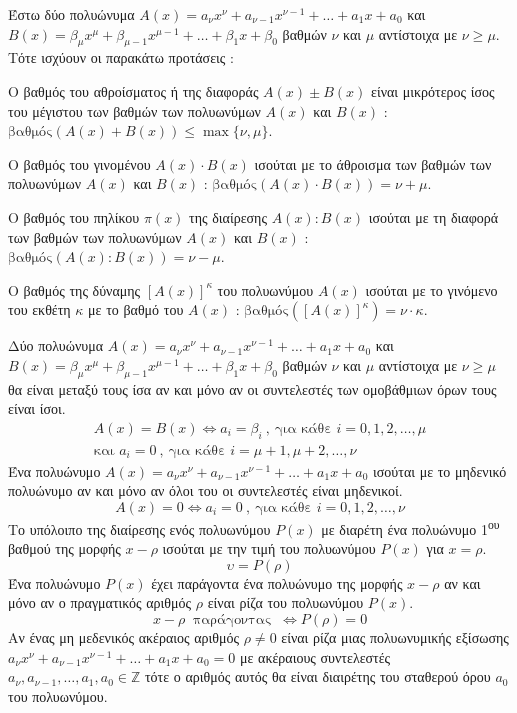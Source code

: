 \documentclass[twoside,nofonts,internet,shmeiwseis]{thewria}
\newcommand{\tss}[1]{\textsuperscript{#1}}
\begin{document}
\thewrhmata
{}
Έστω δύο πολυώνυμα $ A(x)=a_\nu x^\nu+a_{\nu-1}x^{\nu-1}+\ldots+a_1x+a_0 $ και $ B(x)=\beta_\mu x^\mu+\beta_{\mu-1}x^{\mu-1}+\ldots+\beta_1x+\beta_0 $ βαθμών $ \nu $ και $ \mu $ αντίστοιχα με $ \nu\geq\mu $. Τότε ισχύουν οι παρακάτω προτάσεις :
\begin{rlist}
\item Ο βαθμός του αθροίσματος ή της διαφοράς $ A(x)\pm B(x) $ είναι μικρότερος ίσος του μέγιστου των βαθμών των πολυωνύμων $ A(x) $ και $ B(x) $ : $ \textrm{βαθμός}(A(x)+B(x))\leq\max\{\nu,\mu\} $.
\item Ο βαθμός του γινομένου $ A(x)\cdot B(x) $ ισούται με το άθροισμα των βαθμών των πολυωνύμων $ A(x) $ και $ B(x) $ : $ \textrm{βαθμός}(A(x)\cdot B(x))=\nu+\mu $.
\item Ο βαθμός του πηλίκου $ \pi(x) $ της διαίρεσης $ A(x):B(x) $ ισούται με τη διαφορά των βαθμών των πολυωνύμων $ A(x) $ και $ B(x) $ : $ \textrm{βαθμός}(A(x): B(x))=\nu-\mu $.
\item Ο βαθμός της δύναμης $ [A(x)]^\kappa $ του πολυωνύμου $ A(x) $ ισούται με το γινόμενο του εκθέτη $ \kappa $ με το βαθμό του $ A(x) $ : $ \textrm{βαθμός}([A(x)]^\kappa)=\nu\cdot\kappa $.
\end{rlist}
Δύο πολυώνυμα $ A(x)=a_\nu x^\nu+a_{\nu-1}x^{\nu-1}+\ldots+a_1x+a_0 $ και $ B(x)=\beta_\mu x^\mu+\beta_{\mu-1}x^{\mu-1}+\ldots+\beta_1x+\beta_0 $ βαθμών $ \nu $ και $ \mu $ αντίστοιχα με $ \nu\geq\mu $ θα είναι μεταξύ τους ίσα αν και μόνο αν οι συντελεστές των ομοβάθμιων όρων τους είναι ίσοι.
\begin{gather*}
A(x)=B(x)\Leftrightarrow a_i=\beta_i\ ,\ \textrm{για κάθε }i=0,1,2,\ldots,\mu\\
\textrm{και }a_i=0\ ,\ \textrm{για κάθε }i=\mu+1,\mu+2,\ldots,\nu
\end{gather*}
Ένα πολυώνυμο $ A(x)=a_\nu x^\nu+a_{\nu-1}x^{\nu-1}+\ldots+a_1x+a_0 $ ισούται με το μηδενικό πολυώνυμο αν και μόνο αν όλοι του οι συντελεστές είναι μηδενικοί.
\[ A(x)=0\Leftrightarrow a_i=0 \ ,\ \textrm{για κάθε }i=0,1,2,\ldots,\nu\]
Το υπόλοιπο της διαίρεσης ενός πολυωνύμου $ P(x) $ με διαρέτη ένα πολυώνυμο 1\tss{ου} βαθμού της μορφής $ x-\rho $ ισούται με την τιμή του πολυωνύμου $ P(x) $ για $ x=\rho $.
\[ \upsilon=P(\rho) \]
Ένα πολυώνυμο $ P(x) $ έχει παράγοντα ένα πολυώνυμο της μορφής $ x-\rho $ αν και μόνο αν ο πραγματικός αριθμός $ \rho $ είναι ρίζα του πολυωνύμου $ P(x) $.
\[ x-\rho\ \textrm{ παράγοντας }\ \Leftrightarrow P(\rho)=0 \]
Αν ένας μη μεδενικός ακέραιος αριθμός $ \rho\neq0 $ είναι ρίζα μιας πολυωνυμικής εξίσωσης $ a_\nu x^\nu+a_{\nu-1}x^{\nu-1}+\ldots+a_1x+a_0=0 $ με ακέραιους συντελεστές $ a_\nu ,a_{\nu-1},\ldots,a_1,a_0\in\mathbb{Z} $ τότε ο αριθμός αυτός θα είναι διαιρέτης του σταθερού όρου $ a_0 $ του πολυωνύμου.
\newpage
\noindent
\end{document}
